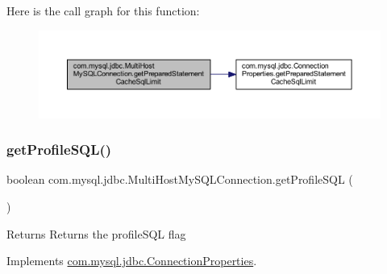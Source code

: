 Here is the call graph for this function\+:
\nopagebreak
\begin{figure}[H]
\begin{center}
\leavevmode
\includegraphics[width=350pt]{classcom_1_1mysql_1_1jdbc_1_1_multi_host_my_s_q_l_connection_a183bd1cac2423d1b6c228c310cb6d43b_cgraph}
\end{center}
\end{figure}
\mbox{\label{classcom_1_1mysql_1_1jdbc_1_1_multi_host_my_s_q_l_connection_a579cb97c35050ac81eea5afe7338122f}} 
\subsubsection{\texorpdfstring{get\+Profile\+S\+Q\+L()}{getProfileSQL()}}
{\footnotesize\ttfamily boolean com.\+mysql.\+jdbc.\+Multi\+Host\+My\+S\+Q\+L\+Connection.\+get\+Profile\+S\+QL (\begin{DoxyParamCaption}{ }\end{DoxyParamCaption})}

\begin{DoxyReturn}{Returns}
Returns the profile\+S\+QL flag 
\end{DoxyReturn}


Implements \mbox{\hyperlink{interfacecom_1_1mysql_1_1jdbc_1_1_connection_properties_af0e1c9e18770d1c2478851ab1dcd1d70}{com.\+mysql.\+jdbc.\+Connection\+Properties}}.

